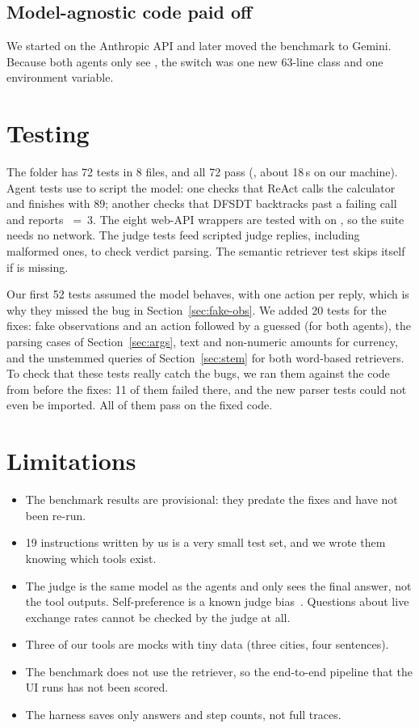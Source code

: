 \documentclass[conference,a4paper]{IEEEtran}
\newcommand{\prov}{provisional}
\begin{document}
\subsection{Model-agnostic code paid off}
We started on the Anthropic API and later moved the benchmark to
Gemini. Because both agents only see , the switch was
one new 63-line class and one environment variable.

\section{Testing}
The  folder has 72 tests in 8 files, and all 72 pass
(, about 18\,s on our machine). Agent tests use  to script the model: one checks
that ReAct calls the calculator and finishes with 89; another checks that
DFSDT backtracks past a failing  call and
reports ~=~3. The eight web-API wrappers are tested
with  on , so the suite needs
no network. The judge tests feed scripted judge replies, including
malformed ones, to check verdict parsing. The semantic retriever test
skips itself if  is missing.

Our first 52 tests assumed the model behaves, with one action per reply,
which is why they missed the bug in Section~\ref{sec:fake-obs}. We added
20 tests for the fixes: fake observations and an action followed by a
guessed  (for both agents), the parsing cases of
Section~\ref{sec:args}, text and non-numeric amounts for currency, and
the unstemmed queries of Section~\ref{sec:stem} for both word-based
retrievers. To check that these tests really catch the bugs, we ran them
against the code from before the fixes: 11 of them failed there, and the
new parser tests could not even be imported. All of them pass on the fixed
code.

\section{Limitations}\label{sec:limits}
\begin{itemize}
  \item The benchmark results are \prov{}: they predate the fixes and
        have not been re-run.
  \item 19 instructions written by us is a very small test set, and we
        wrote them knowing which tools exist.
  \item The judge is the same model as the agents and only sees the final
        answer, not the tool outputs. Self-preference is a known judge
        bias~\cite{zheng2023judge}. Questions about live exchange rates
        cannot be checked by the judge at all.
  \item Three of our tools are mocks with tiny data (three cities, four
        sentences).
  \item The benchmark does not use the retriever, so the end-to-end
        pipeline that the UI runs has not been scored.
  \item The harness saves only answers and step counts, not full traces.
\end{itemize}
\end{document}
